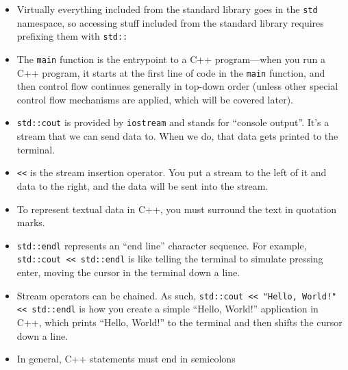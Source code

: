 \documentclass{article}
\begin{document}
\begin{itemize}
    \item Virtually everything included from the standard library goes in the \texttt{std} namespace, so accessing stuff included from the standard library requires prefixing them with \texttt{std::}
    \item The \texttt{main} function is the entrypoint to a C++ program---when you run a C++ program, it starts at the first line of code in the \texttt{main} function, and then control flow continues generally in top-down order (unless other special control flow mechanisms are applied, which will be covered later).
    \item \texttt{std::cout} is provided by \texttt{iostream} and stands for ``console output''. It's a stream that we can send data to. When we do, that data gets printed to the terminal.
    \item \texttt{<<} is the stream insertion operator. You put a stream to the left of it and data to the right, and the data will be sent into the stream.
    \item To represent textual data in C++, you must surround the text in quotation marks.
    \item \texttt{std::endl} represents an ``end line'' character sequence. For example, \texttt{std::cout << std::endl} is like telling the terminal to simulate pressing enter, moving the cursor in the terminal down a line.
    \item Stream operators can be chained. As such, \texttt{std::cout << "Hello, World!" << std::endl} is how you create a simple ``Hello, World!'' application in C++, which prints ``Hello, World!'' to the terminal and then shifts the cursor down a line.
    \item In general, C++ statements must end in semicolons
\end{itemize}
\end{document}
